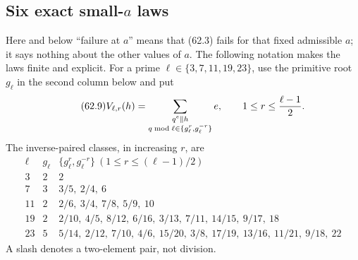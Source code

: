 \documentclass[10pt,reqno]{amsart}
\theoremstyle{definition}
\newcommand{\1}{\mathbf 1}
\begin{document}
\subsection{Six exact small-$a$ laws}
Here and below ``failure at $a$'' means that (62.3) fails for that fixed
admissible $a$; it says nothing about the other values of $a$.  The
following notation makes the laws finite and explicit.  For a prime
$\ell\in\{3,7,11,19,23\}$, use the primitive root $g_\ell$ in the second
column below and put
\begin{equation}\tag{62.9}
 V_{\ell,r}(h)=
 \sum_{\substack{q^e\parallel h\\
       q\bmod\ell\in\{g_\ell^r,g_\ell^{-r}\}}}e,
 \qquad 1\leq r\leq{\ell-1\over2}.
\end{equation}
The inverse-paired classes, in increasing $r$, are
\begingroup\scriptsize
\begin{equation}\tag{62.10}
\begin{array}{c|c|l}
\ell&g_\ell&\{g_\ell^r,g_\ell^{-r}\}\ (1\leq r\leq(\ell-1)/2)\\ \hline
3&2&2\\
7&3&3/5,\ 2/4,\ 6\\
11&2&2/6,\ 3/4,\ 7/8,\ 5/9,\ 10\\
19&2&2/10,\ 4/5,\ 8/12,\ 6/16,\ 3/13,\ 7/11,\ 14/15,\ 9/17,\ 18\\
23&5&5/14,\ 2/12,\ 7/10,\ 4/6,\ 15/20,\ 3/8,\ 17/19,\
       13/16,\ 11/21,\ 9/18,\ 22
\end{array}
\end{equation}
\endgroup
A slash denotes a two-element pair, not division.
\end{document}
